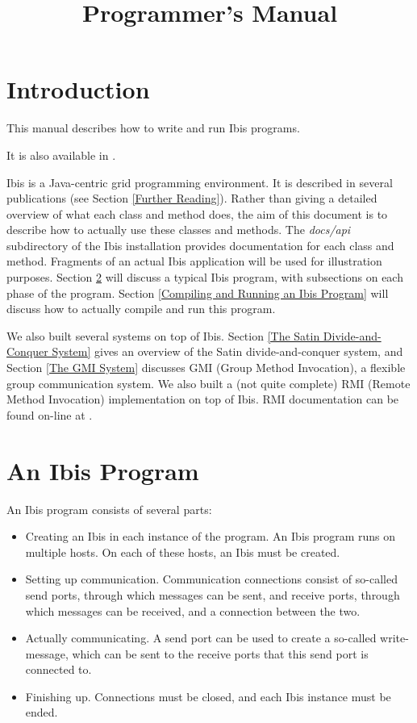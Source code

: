 \documentclass[10pt]{article}
\newcommand{\mysection}[1]{\section{#1}\label{#1}}
\begin{document}
\title{
{}
{}
Programmer's Manual}

\maketitle

\section{Introduction}

This manual describes how to write and run Ibis programs.
\begin{htmlonly}
It is also available in
.
\end{htmlonly}
Ibis is a Java-centric grid programming environment.
It is described in several publications (see Section \ref{Further Reading}).
Rather than giving a detailed overview of what each class and method does,
the aim of this document is to describe how to actually use these classes
and methods.
The \emph{docs/api} subdirectory of the Ibis installation provides
documentation for each class and method.
Fragments of an actual Ibis application will be used for illustration purposes.
Section \ref{An Ibis Program} will discuss a typical Ibis program,
with subsections on each phase of the program.
Section \ref{Compiling and Running an Ibis Program} will discuss how to
actually compile and run this program.

We also built several systems on top of Ibis.
Section \ref{The Satin Divide-and-Conquer System}
gives an overview of the Satin divide-and-conquer
system, and Section \ref{The GMI System} discusses GMI
(Group Method Invocation),
a flexible group communication system.
We also built a (not quite complete) RMI (Remote Method Invocation)
implementation on top of Ibis. RMI documentation can be found on-line at
{}
{}.
 
\mysection{An Ibis Program}
An Ibis program consists of several parts:
\begin{itemize}
\item
Creating an Ibis in each instance of the program.
An Ibis program runs on multiple hosts. On each of these hosts, an Ibis
must be created.
\item
Setting up communication. Communication connections consist of so-called
send ports, through which messages can be sent, and receive ports, through
which messages can be received, and a connection between the two.
\item
Actually communicating. A send port can be used to create a so-called
write-message, which can be sent to the receive ports that this send port
is connected to.
\item
Finishing up. Connections must be closed, and each Ibis instance must
be ended.
\end{itemize}
\end{document}

